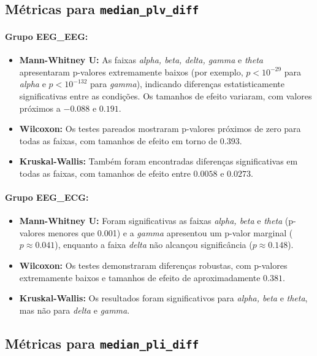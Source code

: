 \subsection{\texorpdfstring{Métricas para \texttt{median\_plv\_diff}}{Métricas para median\_plv\_diff}}
\paragraph{Grupo EEG\_EEG:}
\begin{itemize}
    \item \textbf{Mann-Whitney U:} As faixas \emph{alpha, beta, delta, gamma} e \emph{theta} apresentaram p-valores extremamente baixos (por exemplo, $p < 10^{-29}$ para \emph{alpha} e $p < 10^{-132}$ para \emph{gamma}), indicando diferenças estatisticamente significativas entre as condições. Os tamanhos de efeito variaram, com valores próximos a $-0.088$ e $0.191$.
    \item \textbf{Wilcoxon:} Os testes pareados mostraram p-valores próximos de zero para todas as faixas, com tamanhos de efeito em torno de $0.393$.
    \item \textbf{Kruskal-Wallis:} Também foram encontradas diferenças significativas em todas as faixas, com tamanhos de efeito entre $0.0058$ e $0.0273$.
\end{itemize}

\paragraph{Grupo EEG\_ECG:}
\begin{itemize}
    \item \textbf{Mann-Whitney U:} Foram significativas as faixas \emph{alpha, beta} e \emph{theta} (p-valores menores que 0.001) e a \emph{gamma} apresentou um p-valor marginal ($p \approx 0.041$), enquanto a faixa \emph{delta} não alcançou significância ($p \approx 0.148$).
    \item \textbf{Wilcoxon:} Os testes demonstraram diferenças robustas, com p-valores extremamente baixos e tamanhos de efeito de aproximadamente $0.381$.
    \item \textbf{Kruskal-Wallis:} Os resultados foram significativos para \emph{alpha, beta} e \emph{theta}, mas não para \emph{delta} e \emph{gamma}.
\end{itemize}

\subsection{\texorpdfstring{Métricas para \texttt{median\_pli\_diff}}{Métricas para median\_pli\_diff}}
